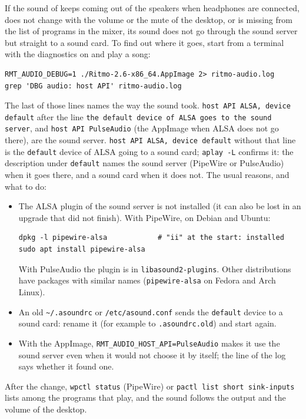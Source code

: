 If the sound of \RITMO{} keeps coming out of the speakers when headphones are connected, does not change with the
volume or the mute of the desktop, or \RITMO{} is missing from the list of programs in the mixer, its sound does not go
through the sound server but straight to a sound card. To find out where it goes, start \RITMO{} from a terminal with
the diagnostics on and play a song:

\begin{lstlisting}
RMT_AUDIO_DEBUG=1 ./Ritmo-2.6-x86_64.AppImage 2> ritmo-audio.log
grep 'DBG audio: host API' ritmo-audio.log
\end{lstlisting}

The last of those lines names the way the sound took. \texttt{host API ALSA, device default} after the line
\texttt{the default device of ALSA goes to the sound server}, and \texttt{host API PulseAudio} (the AppImage when
ALSA does not go there), are the sound server. \texttt{host API ALSA, device default} without that line is the
\texttt{default} device of ALSA going to a sound card; \texttt{aplay -L} confirms it: the description under
\texttt{default} names the sound server (PipeWire or PulseAudio) when it goes there, and a sound card when it does
not. The usual reasons, and what to do:

\begin{itemize}
  \item The ALSA plugin of the sound server is not installed (it can also be lost in an upgrade that did not finish).
        With PipeWire, on Debian and Ubuntu:
\begin{lstlisting}
dpkg -l pipewire-alsa            # "ii" at the start: installed
sudo apt install pipewire-alsa
\end{lstlisting}
        With PulseAudio the plugin is in \texttt{libasound2-plugins}. Other distributions have packages with similar
        names (\texttt{pipewire-alsa} on Fedora and Arch Linux).
  \item An old \texttt{\textasciitilde/.asoundrc} or \texttt{/etc/asound.conf} sends the \texttt{default} device to a
        sound card: rename it (for example to \texttt{.asoundrc.old}) and start \RITMO{} again.
  \item With the AppImage, \texttt{RMT\_AUDIO\_HOST\_API=PulseAudio} makes it use the sound server even when it would
        not choose it by itself; the line of the log says whether it found one.
\end{itemize}

After the change, \texttt{wpctl status} (PipeWire) or \texttt{pactl list short sink-inputs} lists \RITMO{} among the
programs that play, and the sound follows the output and the volume of the desktop.

